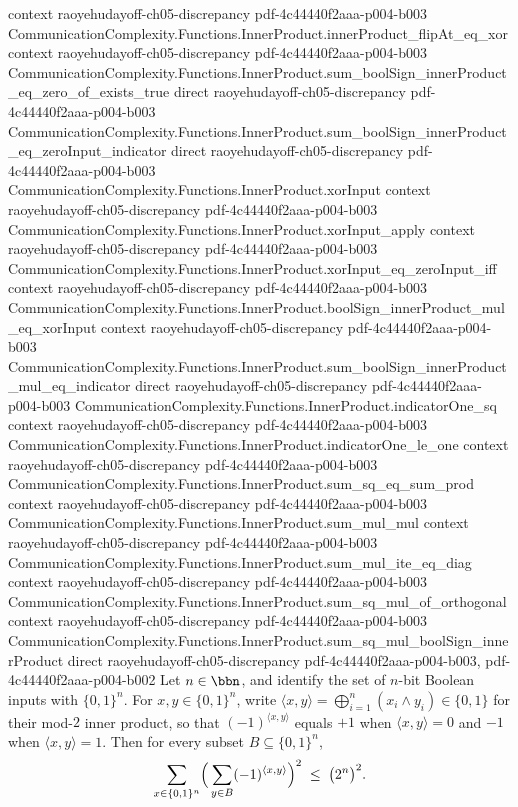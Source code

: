\begin{lemma}
  {context}
  {raoyehudayoff-ch05-discrepancy}
  {pdf-4c44440f2aaa-p004-b003}
\proofstep
  {CommunicationComplexity.Functions.InnerProduct.innerProduct_flipAt_eq_xor}
  {context}
  {raoyehudayoff-ch05-discrepancy}
  {pdf-4c44440f2aaa-p004-b003}
\proofstep
  {CommunicationComplexity.Functions.InnerProduct.sum_boolSign_innerProduct_eq_zero_of_exists_true}
  {direct}
  {raoyehudayoff-ch05-discrepancy}
  {pdf-4c44440f2aaa-p004-b003}
\proofstep
  {CommunicationComplexity.Functions.InnerProduct.sum_boolSign_innerProduct_eq_zeroInput_indicator}
  {direct}
  {raoyehudayoff-ch05-discrepancy}
  {pdf-4c44440f2aaa-p004-b003}
\proofstep
  {CommunicationComplexity.Functions.InnerProduct.xorInput}
  {context}
  {raoyehudayoff-ch05-discrepancy}
  {pdf-4c44440f2aaa-p004-b003}
\proofstep
  {CommunicationComplexity.Functions.InnerProduct.xorInput_apply}
  {context}
  {raoyehudayoff-ch05-discrepancy}
  {pdf-4c44440f2aaa-p004-b003}
\proofstep
  {CommunicationComplexity.Functions.InnerProduct.xorInput_eq_zeroInput_iff}
  {context}
  {raoyehudayoff-ch05-discrepancy}
  {pdf-4c44440f2aaa-p004-b003}
\proofstep
  {CommunicationComplexity.Functions.InnerProduct.boolSign_innerProduct_mul_eq_xorInput}
  {context}
  {raoyehudayoff-ch05-discrepancy}
  {pdf-4c44440f2aaa-p004-b003}
\proofstep
  {CommunicationComplexity.Functions.InnerProduct.sum_boolSign_innerProduct_mul_eq_indicator}
  {direct}
  {raoyehudayoff-ch05-discrepancy}
  {pdf-4c44440f2aaa-p004-b003}
\proofstep
  {CommunicationComplexity.Functions.InnerProduct.indicatorOne_sq}
  {context}
  {raoyehudayoff-ch05-discrepancy}
  {pdf-4c44440f2aaa-p004-b003}
\proofstep
  {CommunicationComplexity.Functions.InnerProduct.indicatorOne_le_one}
  {context}
  {raoyehudayoff-ch05-discrepancy}
  {pdf-4c44440f2aaa-p004-b003}
\proofstep
  {CommunicationComplexity.Functions.InnerProduct.sum_sq_eq_sum_prod}
  {context}
  {raoyehudayoff-ch05-discrepancy}
  {pdf-4c44440f2aaa-p004-b003}
\proofstep
  {CommunicationComplexity.Functions.InnerProduct.sum_mul_mul}
  {context}
  {raoyehudayoff-ch05-discrepancy}
  {pdf-4c44440f2aaa-p004-b003}
\proofstep
  {CommunicationComplexity.Functions.InnerProduct.sum_mul_ite_eq_diag}
  {context}
  {raoyehudayoff-ch05-discrepancy}
  {pdf-4c44440f2aaa-p004-b003}
\proofstep
  {CommunicationComplexity.Functions.InnerProduct.sum_sq_mul_of_orthogonal}
  {context}
  {raoyehudayoff-ch05-discrepancy}
  {pdf-4c44440f2aaa-p004-b003}
\proofstep
  {CommunicationComplexity.Functions.InnerProduct.sum_sq_mul_boolSign_innerProduct}
  {direct}
  {raoyehudayoff-ch05-discrepancy}
  {pdf-4c44440f2aaa-p004-b003,
    pdf-4c44440f2aaa-p004-b002}
Let $n \in \bbn$, and identify the set of $n$-bit Boolean inputs with $\{0,1\}^n$. For
$x, y \in \{0,1\}^n$, write $\langle x, y\rangle = \bigoplus_{i=1}^{n} (x_i \wedge y_i)
\in \{0,1\}$ for their mod-$2$ inner product, so that $(-1)^{\langle x, y\rangle}$
equals $+1$ when $\langle x, y\rangle = 0$ and $-1$ when $\langle x, y\rangle = 1$. Then
for every subset $B \subseteq \{0,1\}^n$,
\[
  \sum_{x \in \{0,1\}^n}
    \Bigl(\, \sum_{y \in B} (-1)^{\langle x, y\rangle} \Bigr)^{2}
  \;\le\; \bigl(2^{n}\bigr)^{2}.
\]
\end{lemma}

